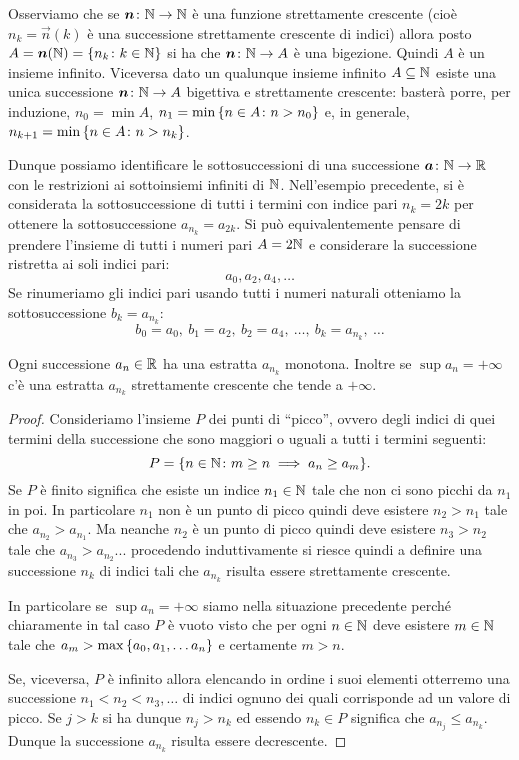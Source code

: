 Osserviamo che se $\boldsymbol n\colon {\mathbb N}\to {\mathbb N}$ è una
funzione strettamente crescente
(cioè $n_k=\vec n(k)$ è una successione strettamente crescente di indici)
allora posto $A=\boldsymbol n({\mathbb N})={\left\{ n_k\colon k\in {\mathbb N} \right\}}$ si ha che
$\boldsymbol n \colon {\mathbb N} \to A$ è una bigezione. Quindi $A$ è un insieme infinito.
Viceversa dato un qualunque insieme infinito $A\subseteq {\mathbb N}$ esiste una
unica successione $\boldsymbol n\colon {\mathbb N} \to A$ bigettiva e strettamente crescente:
basterà porre, per induzione,
$n_0 = \min A$, $n_1 = \min {\left\{ n\in A \colon n > n_0 \right\}}$
e, in generale,
 $n_{k+1} = \min{\left\{  n\in A \colon n > n_k \right\}}$.

Dunque possiamo identificare le sottosuccessioni di una successione
$\boldsymbol a \colon {\mathbb N} \to {\mathbb R}$ con le restrizioni ai sottoinsiemi infiniti di ${\mathbb N}$.
Nell'esempio precedente, si è considerata la sottosuccessione
di tutti i termini con indice pari $n_k=2k$ per ottenere la sottosuccessione
$a_{n_k} = a_{2k}$. Si può equivalentemente pensare di prendere l'insieme di
tutti i numeri pari $A=2{\mathbb N}$ e considerare la successione ristretta ai soli
indici pari:
\[
  a_0, a_2, a_4, \dots
\]
Se rinumeriamo gli indici pari usando tutti i numeri naturali otteniamo
la sottosuccessione $b_k=a_{n_k}$:
\[
  b_0 = a_0,\ b_1 = a_2,\ b_2 = a_4,\ \dots,\ b_k = a_{n_k},\ \dots
\]

\begin{lemma}%
\label{lem:estratte_monotone}%
Ogni successione $a_n\in {\mathbb R}$ ha una estratta $a_{n_k}$ monotona.
Inoltre se $\sup a_n = +\infty$ c'è una estratta $a_{n_k}$
strettamente crescente che tende a $+\infty$.
\end{lemma}
%
\begin{proof}
Consideriamo l'insieme $P$ dei punti di ``picco'', ovvero degli indici
di quei termini della successione che sono maggiori o uguali a tutti i termini
seguenti:
\[
  P = {\left\{ n\in {\mathbb N}\colon m\ge n \implies a_n\ge a_m \right\}}.
\]
Se $P$ è finito
significa che esiste un indice $n_1\in {\mathbb N}$ tale
che non ci sono picchi da $n_1$ in poi. In particolare $n_1$ non è un punto di
picco
quindi deve esistere $n_2>n_1$ tale che $a_{n_2}>a_{n_1}$.
Ma neanche $n_2$ è un punto di picco quindi deve esistere $n_3>n_2$ tale
che $a_{n_3}>a_{n_2}$... procedendo induttivamente si riesce quindi a definire
una successione $n_k$ di indici tali che $a_{n_k}$ risulta essere strettamente
crescente.

In particolare se $\sup a_n = +\infty$ siamo nella situazione precedente 
perché chiaramente in tal caso $P$ è vuoto visto che per ogni $n\in {\mathbb N}$ 
deve esistere $m\in {\mathbb N}$ tale che $a_m > \max{\left\{ a_0, a_1, \dots a_n \right\}}$
e certamente $m>n$.

Se, viceversa, $P$ è infinito allora elencando in ordine i suoi elementi otterremo
una successione $n_1 < n_2 < n_3, \dots$ di indici ognuno dei quali corrisponde ad un valore
di picco. 
Se $j>k$ si ha dunque $n_j>n_k$ ed essendo $n_k\in P$ significa che
$a_{n_j} \le a_{n_k}$. 
Dunque la successione $a_{n_k}$ risulta essere decrescente.
\end{proof}


